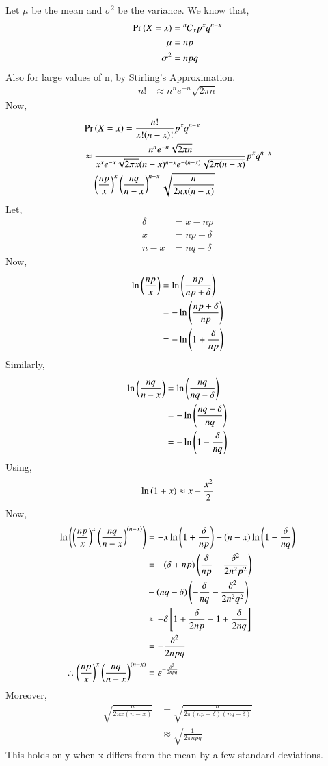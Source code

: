 \documentclass[journal,12pt,twocolumn]{IEEEtran}
\newcommand{\permcomb}[4][0mu]{{{}^{#3}\mkern#1#2_{#4}}}
\newcommand{\comb}[1][-1mu]{\permcomb[#1]{C}}
\begin{document}
Let $\mu$ be the mean and $\sigma^2$ be the variance.
We know that,
\begin{align}
    \pr{X=x} &= \comb{n}{x}p^xq^{n-x}\\
    \mu &= np\\
    \sigma^2 &= npq
\end{align}
Also for large values of n, by Stirling's Approximation.
\begin{align}
    n! &\approx n^n e^{-n} \sqrt{2\pi n}
\end{align}
Now,
\begin{align}
    &\Pr\left(X = x\right) = \frac{n!}{x!(n-x)!}p^xq^{n-x}\\
    &\approx \frac{n^n e^{-n} \sqrt{2\pi n}}{x^x e^{-x} \sqrt{2\pi x} (n-x)^{n-x} e^{-(n-x)} \sqrt{2\pi (n-x)}} p^x q^{n-x}\\
    &= \left(\frac{np}{x}\right)^x \left(\frac{nq}{n-x}\right)^{n-x} \sqrt{\frac{n}{2\pi x(n-x)}}
\end{align}
Let,
\begin{align}
    \delta &= x - np\\  
    x &= np + \delta\\
    n-x &= nq -\delta
\end{align}
Now,
\begin{align}
    \ln{\ensuremath{\left(\frac{np}{x}\right)}}&= \ln{\ensuremath{\left(\frac{np}{np+\delta}\right)}}\\
    &= -\ln{\ensuremath{\left(\frac{np+\delta}{np}\right)}}\\
    &= -\ln{\ensuremath{\left(1+\frac{\delta}{np}\right)}}
\end{align}
Similarly,
\begin{align}
    \ln{\ensuremath{\left(\frac{nq}{n-x}\right)}}&= \ln{\ensuremath{\left(\frac{nq}{nq-\delta}\right)}}\\
    &= -\ln{\ensuremath{\left(\frac{nq-\delta}{nq}\right)}}\\
    &= -\ln{\ensuremath{\left(1-\frac{\delta}{nq}\right)}}
\end{align}
Using,
\begin{align}
    \ln{\ensuremath{\left(1+x\right)}} \approx x-\frac{x^2}{2}
\end{align}
Now,
\begin{align}
    \ln{\ensuremath{\left(\left(\frac{np}{x}\right)^x \left(\frac{nq}{n-x}\right)^{(n-x)}\right)}}&=-x\ln{\ensuremath{\left(1+\frac{\delta}{np}\right)}}-(n-x)\ln{\ensuremath{\left(1-\frac{\delta}{nq}\right)}}\\
    &=-(\delta + np)\left(\frac{\delta}{np}-\frac{\delta^2}{2n^2 p^2}\right)\nonumber\\
    &-(nq-\delta)\left(-\frac{\delta}{nq}-\frac{\delta^2}{2n^2q^2}\right)\\
    &\approx -\delta {}\left[1+\frac{\delta}{2np}-1+\frac{\delta}{2nq}\right]\\
    &= - \frac{\delta^2}{2npq}\\
    \therefore \left(\frac{np}{x}\right)^x \left(\frac{nq}{n-x}\right)^{(n-x)}&=e^{-\frac{\delta^2}{2npq}}
\end{align}
Moreover,
\begin{align}
    \sqrt{\frac{n}{2\pi x(n-x)}} &= \sqrt{\frac{n}{2\pi (np+\delta)(nq-\delta)}}\\
    &\approx \sqrt{\frac{1}{2\pi npq}}
\end{align}
This holds only when x differs from the mean by a few standard deviations.
\end{document}

